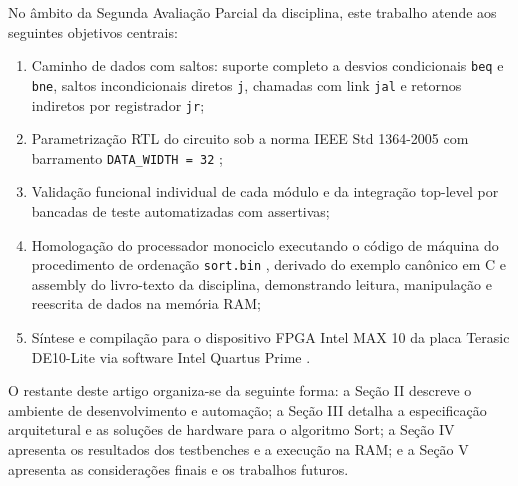 No âmbito da Segunda Avaliação Parcial da disciplina, este trabalho atende aos seguintes objetivos centrais:
\begin{enumerate}
    \item Caminho de dados com saltos: suporte completo a desvios condicionais \texttt{beq} e \texttt{bne}, saltos incondicionais diretos \texttt{j}, chamadas com link \texttt{jal} e retornos indiretos por registrador \texttt{jr};
    \item Parametrização RTL do circuito sob a norma IEEE Std 1364-2005 com barramento \texttt{DATA\_WIDTH = 32} \cite{verilog_std};
    \item Validação funcional individual de cada módulo e da integração top-level por bancadas de teste automatizadas com assertivas;
    \item Homologação do processador monociclo executando o código de máquina do procedimento de ordenação \texttt{sort.bin} \cite{patterson_mips}, derivado do exemplo canônico em C e assembly do livro-texto da disciplina, demonstrando leitura, manipulação e reescrita de dados na memória RAM;
    \item Síntese e compilação para o dispositivo FPGA Intel MAX 10 da placa Terasic DE10-Lite \cite{terasic_de10_lite_user_manual} via software Intel Quartus Prime \cite{intel_quartus_handbook}.
\end{enumerate}

O restante deste artigo organiza-se da seguinte forma: a Seção II descreve o ambiente de desenvolvimento e automação; a Seção III detalha a especificação arquitetural e as soluções de hardware para o algoritmo Sort; a Seção IV apresenta os resultados dos testbenches e a execução na RAM; e a Seção V apresenta as considerações finais e os trabalhos futuros.
